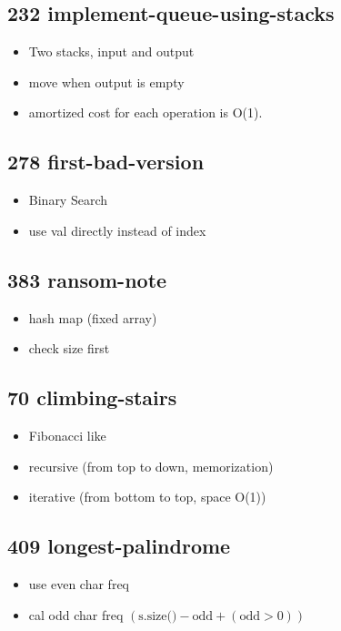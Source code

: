 \subsection{232 implement-queue-using-stacks}

\begin{itemize}
	\item Two stacks, input and output
	\item move when output is empty
	\item amortized cost for each operation is O(1).
\end{itemize}

\subsection{278 first-bad-version}

\begin{itemize}
	\item Binary Search
	\item use val directly instead of index
\end{itemize}

\subsection{383 ransom-note}

\begin{itemize}
	\item hash map (fixed array)
	\item check size first
\end{itemize}

\subsection{70 climbing-stairs}

\begin{itemize}
	\item Fibonacci like
	\item recursive (from top to down, memorization)
	\item iterative (from bottom to top, space O(1))
\end{itemize}

\subsection{409 longest-palindrome}

\begin{itemize}
	\item use even char freq
	\item cal odd char freq \(\left(\textrm{s.size()} - \textrm{odd} + \left(\textrm{odd} > 0\right)\right)\)
\end{itemize}

